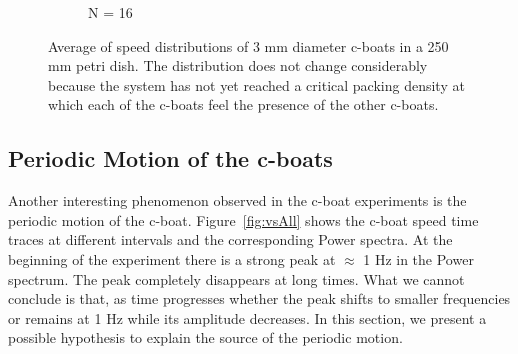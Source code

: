 \documentclass[12pt]{article}
\begin{document}
\begin{figure}[h!]
\begin{subfigure}[h!]{\textwidth}
       \caption{N = 16}
       \label{fig:vpdf_16_25cm}
	\end{subfigure}
	\caption{Average of speed distributions of 3 mm diameter c-boats in a 250 mm petri dish. The distribution does not change considerably because the system has not yet reached a critical packing density at which each of the c-boats feel the presence of the other c-boats.}
	\label{fig:vpdfall25cm}
\end{figure}

\subsection{Periodic Motion of the c-boats}
Another interesting phenomenon observed in the c-boat experiments is the periodic motion of the c-boat. Figure~\ref{fig:vsAll} shows the c-boat speed time traces at different intervals and the corresponding Power spectra. At the beginning of the experiment there is a strong peak at $\approx$ 1 Hz in the Power spectrum. The peak completely disappears at long times. What we cannot conclude is that, as time progresses whether the peak shifts to smaller frequencies or remains at 1 Hz while its amplitude decreases. In this section, we present a possible hypothesis to explain the source of the periodic motion. 
\end{document}
